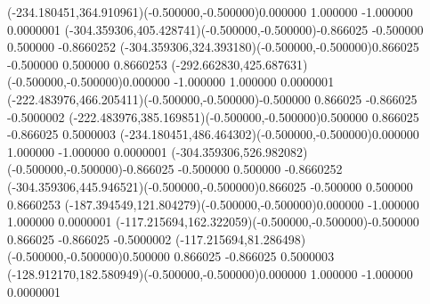 \color{ASYcolor}
\fontsize{12.000000}{14.400000}\selectfont
\ASYalignT(-234.180451,364.910961)(-0.500000,-0.500000){0.000000 1.000000 -1.000000 0.000000}{1}%
\color{ASYcolor}
\fontsize{12.000000}{14.400000}\selectfont
\ASYalignT(-304.359306,405.428741)(-0.500000,-0.500000){-0.866025 -0.500000 0.500000 -0.866025}{2}%
\color{ASYcolor}
\fontsize{12.000000}{14.400000}\selectfont
\ASYalignT(-304.359306,324.393180)(-0.500000,-0.500000){0.866025 -0.500000 0.500000 0.866025}{3}%
\color{ASYcolor}
\fontsize{12.000000}{14.400000}\selectfont
\ASYalignT(-292.662830,425.687631)(-0.500000,-0.500000){0.000000 -1.000000 1.000000 0.000000}{1}%
\color{ASYcolor}
\fontsize{12.000000}{14.400000}\selectfont
\ASYalignT(-222.483976,466.205411)(-0.500000,-0.500000){-0.500000 0.866025 -0.866025 -0.500000}{2}%
\color{ASYcolor}
\fontsize{12.000000}{14.400000}\selectfont
\ASYalignT(-222.483976,385.169851)(-0.500000,-0.500000){0.500000 0.866025 -0.866025 0.500000}{3}%
\color{ASYcolor}
\fontsize{12.000000}{14.400000}\selectfont
\ASYalignT(-234.180451,486.464302)(-0.500000,-0.500000){0.000000 1.000000 -1.000000 0.000000}{1}%
\color{ASYcolor}
\fontsize{12.000000}{14.400000}\selectfont
\ASYalignT(-304.359306,526.982082)(-0.500000,-0.500000){-0.866025 -0.500000 0.500000 -0.866025}{2}%
\color{ASYcolor}
\fontsize{12.000000}{14.400000}\selectfont
\ASYalignT(-304.359306,445.946521)(-0.500000,-0.500000){0.866025 -0.500000 0.500000 0.866025}{3}%
\color{ASYcolor}
\fontsize{12.000000}{14.400000}\selectfont
\ASYalignT(-187.394549,121.804279)(-0.500000,-0.500000){0.000000 -1.000000 1.000000 0.000000}{1}%
\color{ASYcolor}
\fontsize{12.000000}{14.400000}\selectfont
\ASYalignT(-117.215694,162.322059)(-0.500000,-0.500000){-0.500000 0.866025 -0.866025 -0.500000}{2}%
\color{ASYcolor}
\fontsize{12.000000}{14.400000}\selectfont
\ASYalignT(-117.215694,81.286498)(-0.500000,-0.500000){0.500000 0.866025 -0.866025 0.500000}{3}%
\color{ASYcolor}
\fontsize{12.000000}{14.400000}\selectfont
\ASYalignT(-128.912170,182.580949)(-0.500000,-0.500000){0.000000 1.000000 -1.000000 0.000000}{1}%
\color{ASYcolor}
